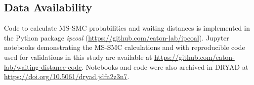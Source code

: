 \documentclass[11pt]{article}
\begin{document}
\subsection{Data Availability}
Code to calculate MS-SMC probabilities and waiting distances is 
implemented in the Python package \emph{ipcoal} 
(\url{https://github.com/eaton-lab/ipcoal}). 
Jupyter notebooks demonstrating the MS-SMC calculations and with 
reproducible code used for validations in this study are available
at \url{https://github.com/eaton-lab/waiting-distance-code}. Notebooks
and code were also archived in DRYAD at
\url{https://doi.org/10.5061/dryad.jdfn2z3n7}.



  










\end{document}
